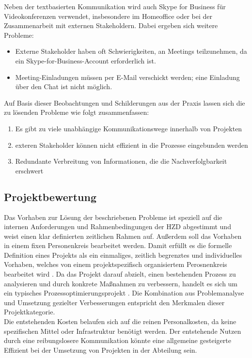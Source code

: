 \documentclass[ThesisDJ.tex]{subfiles}
\begin{document}
  Neben der textbasierten Kommunikation wird auch Skype for Business für Videokonferenzen verwendet, insbesondere im Homeoffice oder bei 
  der Zusammenarbeit mit externen Stakeholdern. Dabei ergeben sich weitere Probleme:

  \begin{itemize}
    \item Externe Stakeholder haben oft Schwierigkeiten, an Meetings teilzunehmen, da ein Skype-for-Business-Account erforderlich ist.
    \item Meeting-Einladungen müssen per E-Mail verschickt werden; eine Einladung über den Chat ist nicht möglich.
  \end{itemize}

  Auf Basis dieser Beobachtungen und Schilderungen aus der Praxis lassen sich die zu lösenden Probleme wie folgt zusammenfassen:

  \begin{enumerate}
    \item Es gibt zu viele unabhängige Kommunikationswege innerhalb von Projekten
    \item exteren Stakeholder können nicht effizient in die Prozesse eingebunden werden 
    \item Redundante Verbreitung von Informationen, die die Nachverfolgbarkeit erschwert
  \end{enumerate}

	\subsection{Projektbewertung}
  Das Vorhaben zur Lösung der beschriebenen Probleme ist speziell auf die internen Anforderungen und Rahmenbedingungen der HZD abgestimmt 
  und weist einen klar definierten zeitlichen Rahmen auf. Außerdem soll das Vorhaben in einem fixen Personenkreis bearbeitet werden.
  Damit erfüllt es die formelle Definition eines Projekts als ein einmaliges, zeitlich begrenztes und individuelles Vorhaben,
  welches von einem projektspezifisch organisiertem Perosnenkreis bearbeitet wird \cite{bronimann_projektmanagement_2022}. 
  Da das Projekt darauf abzielt, einen bestehenden Prozess zu analysieren und durch konkrete Maßnahmen zu verbessern, 
  handelt es sich um ein typisches Prozessoptimierungsprojekt \cite[S.~8]{kuster_handbuch_2022}. Die Kombination aus Problemanalyse und Umsetzung 
  gezielter Verbesserungen entspricht den Merkmalen dieser Projektkategorie. \\

  Die entstehenden Kosten belaufen sich auf die reinen Personalkosten, da keine spezifischen Mittel oder Infrastruktur benötigt werden. Der entstehende
  Nutzen durch eine reibungslosere Kommunikation könnte eine allgemeine gesteigerte Effizient bei der Umsetzung von Projekten in der Abteilung sein.
	
\end{document}
